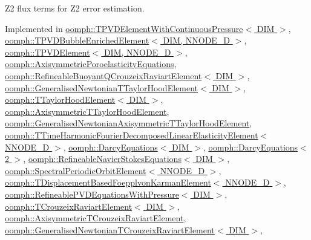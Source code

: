Z2 \textquotesingle{}flux\textquotesingle{} terms for Z2 error estimation. 



Implemented in \hyperlink{classoomph_1_1TPVDElementWithContinuousPressure_ad86fa95c068d3ae0735729e42f5fe3c1}{oomph\+::\+T\+P\+V\+D\+Element\+With\+Continuous\+Pressure$<$ D\+I\+M $>$}, \hyperlink{classoomph_1_1TPVDBubbleEnrichedElement_a7ce226afdc77f8ea5aa300b8026e4809}{oomph\+::\+T\+P\+V\+D\+Bubble\+Enriched\+Element$<$ D\+I\+M, N\+N\+O\+D\+E\+\_\+D $>$}, \hyperlink{classoomph_1_1TPVDElement_a156300359d98bc69d81773b3b609329f}{oomph\+::\+T\+P\+V\+D\+Element$<$ D\+I\+M, N\+N\+O\+D\+E\+\_\+D $>$}, \hyperlink{classoomph_1_1AxisymmetricPoroelasticityEquations_a0a27551f83320812212a8f72a67740e2}{oomph\+::\+Axisymmetric\+Poroelasticity\+Equations}, \hyperlink{classoomph_1_1RefineableBuoyantQCrouzeixRaviartElement_a1b78fb6b311b89cff1b57fcaacd924d7}{oomph\+::\+Refineable\+Buoyant\+Q\+Crouzeix\+Raviart\+Element$<$ D\+I\+M $>$}, \hyperlink{classoomph_1_1GeneralisedNewtonianTTaylorHoodElement_a7089cf0349c047adcb4d600c4bdc66cc}{oomph\+::\+Generalised\+Newtonian\+T\+Taylor\+Hood\+Element$<$ D\+I\+M $>$}, \hyperlink{classoomph_1_1TTaylorHoodElement_a6442b4be0666587043f9a837c0054519}{oomph\+::\+T\+Taylor\+Hood\+Element$<$ D\+I\+M $>$}, \hyperlink{classoomph_1_1AxisymmetricTTaylorHoodElement_ac7cab08cebeb16771206d55497bde22a}{oomph\+::\+Axisymmetric\+T\+Taylor\+Hood\+Element}, \hyperlink{classoomph_1_1GeneralisedNewtonianAxisymmetricTTaylorHoodElement_ae82615d8eb1595a83abceddf43366dbf}{oomph\+::\+Generalised\+Newtonian\+Axisymmetric\+T\+Taylor\+Hood\+Element}, \hyperlink{classoomph_1_1TTimeHarmonicFourierDecomposedLinearElasticityElement_ad910e9982be82dee39ec30f0967e00cd}{oomph\+::\+T\+Time\+Harmonic\+Fourier\+Decomposed\+Linear\+Elasticity\+Element$<$ N\+N\+O\+D\+E\+\_\+D $>$}, \hyperlink{classoomph_1_1DarcyEquations_a5c077b66056e1d66c0bd8f0430875bf8}{oomph\+::\+Darcy\+Equations$<$ D\+I\+M $>$}, \hyperlink{classoomph_1_1DarcyEquations_a5c077b66056e1d66c0bd8f0430875bf8}{oomph\+::\+Darcy\+Equations$<$ 2 $>$}, \hyperlink{classoomph_1_1RefineableNavierStokesEquations_af26506994293f9d72d0382c1efe67749}{oomph\+::\+Refineable\+Navier\+Stokes\+Equations$<$ D\+I\+M $>$}, \hyperlink{classoomph_1_1SpectralPeriodicOrbitElement_aee2d7222e52f4d59692b8f1ac3964b17}{oomph\+::\+Spectral\+Periodic\+Orbit\+Element$<$ N\+N\+O\+D\+E\+\_\+D $>$}, \hyperlink{classoomph_1_1TDisplacementBasedFoepplvonKarmanElement_a921610ebc718302d9e9fbb84e6f142f3}{oomph\+::\+T\+Displacement\+Based\+Foepplvon\+Karman\+Element$<$ N\+N\+O\+D\+E\+\_\+D $>$}, \hyperlink{classoomph_1_1RefineablePVDEquationsWithPressure_a34b62df5ef5a8c6ee6e228a0c4d31582}{oomph\+::\+Refineable\+P\+V\+D\+Equations\+With\+Pressure$<$ D\+I\+M $>$}, \hyperlink{classoomph_1_1TCrouzeixRaviartElement_a7710fd1d14ecd50ee389cac1c57871b6}{oomph\+::\+T\+Crouzeix\+Raviart\+Element$<$ D\+I\+M $>$}, \hyperlink{classoomph_1_1AxisymmetricTCrouzeixRaviartElement_a7b65a77278cdf24ceac3099dc29920db}{oomph\+::\+Axisymmetric\+T\+Crouzeix\+Raviart\+Element}, \hyperlink{classoomph_1_1GeneralisedNewtonianTCrouzeixRaviartElement_af41b2ba4e62e9025ca751e79ee570901}{oomph\+::\+Generalised\+Newtonian\+T\+Crouzeix\+Raviart\+Element$<$ D\+I\+M $>$}, 